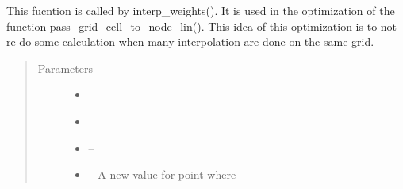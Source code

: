 \documentclass[letterpaper,10pt,english]{sphinxmanual}
\begin{document}
\begin{fulllineitems}
\label{\detokenize{index:src.manage_grid_8.interpolate_opti}}
This fucntion is called by interp\_weights(). It is used in the optimization of the function pass\_grid\_cell\_to\_node\_lin().
This idea of this optimization is to not re-do some calculation when many interpolation are done on the same grid.
\begin{quote}\begin{description}
\item[{Parameters}] \leavevmode\begin{itemize}
\item {} 
 -- 

\item {} 
 -- 

\item {} 
 -- 

\item {} 
 -- A new value for point where

\end{itemize}

\end{description}\end{quote}

\end{fulllineitems}

\end{document}
